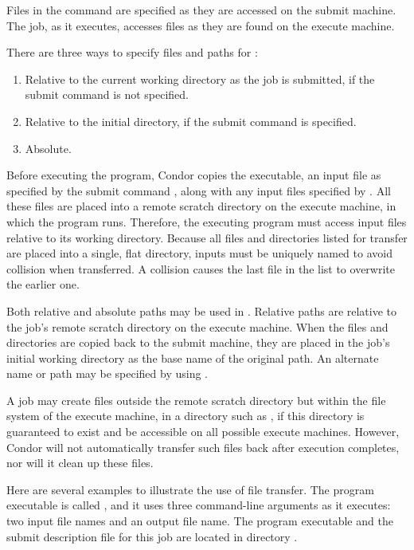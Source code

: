 Files in the  command
are specified as they are accessed on the submit machine.
The job, as it executes, accesses files as they are
found on the execute machine.

There are three ways to specify files and paths
for :
\begin{enumerate}
\item Relative to the current working directory as the job is submitted,
if the submit command  is not specified.
\item Relative to the initial directory, if the submit command 
 is specified.
\item Absolute.
\end{enumerate}

Before executing the program, Condor copies the
executable, an input file as specified
by the submit command ,
along with any input files specified 
by .
All these files are placed into
a remote scratch directory on the execute machine,
in which the program runs.
Therefore,
the executing program must access input files relative to its
working directory.
Because all files and directories listed for transfer are placed into a single,
flat directory,
inputs must be uniquely named to
avoid collision when transferred.
A collision causes the last file in the list to
overwrite the earlier one.

Both relative and absolute paths may be used in
.  Relative paths are relative to
the job's remote scratch directory on the execute machine.
When the files and directories are copied back to the submit machine, they
are placed in the job's initial working directory as the base name of
the original path.  An alternate name or path may be specified by using
.

A job may create files outside the remote scratch directory
but within the file system of the execute machine,
in a directory such as ,
if this directory is guaranteed to exist and be
accessible on all possible execute machines.
However,
Condor will not automatically
transfer such files back after execution completes, nor will it clean
up these files.

Here are several examples to illustrate the use of file transfer.
The program executable is called ,
and it uses three command-line arguments as it executes: 
two input file names and an output file name.
The program executable and the submit description file 
for this job are located in directory
. 

